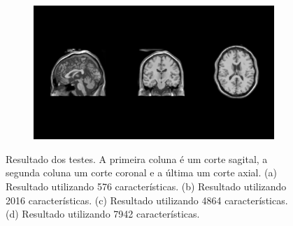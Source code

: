 \begin{figure}[H]
\begin{subfigure}[t]{0.5\textwidth}
      \label{fig:equalizedImage}
    \end{subfigure}
    \begin{subfigure}[t]{0.5\textwidth}
      \includegraphics[width=\textwidth]{figuras/result004.png}
      \label{fig:equalizedImage}
    \end{subfigure}
    \caption{Resultado dos testes. A primeira coluna é um corte sagital,
             a segunda coluna um corte coronal e a última um corte axial.
             (a) Resultado utilizando 576 características.
             (b) Resultado utilizando 2016 características.
             (c) Resultado utilizando 4864 características.
             (d) Resultado utilizando 7942 características.}
    \label{fig:equalization}
\end{figure}
